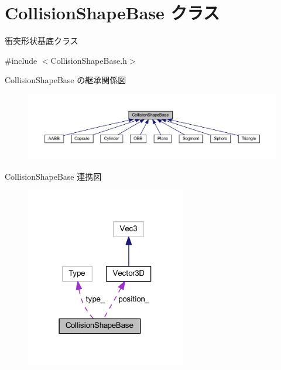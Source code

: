 \hypertarget{class_collision_shape_base}{}\section{Collision\+Shape\+Base クラス}
\label{class_collision_shape_base}


衝突形状基底クラス  




{\ttfamily \#include $<$Collision\+Shape\+Base.\+h$>$}



Collision\+Shape\+Base の継承関係図\nopagebreak
\begin{figure}[H]
\begin{center}
\leavevmode
\includegraphics[width=350pt]{class_collision_shape_base__inherit__graph}
\end{center}
\end{figure}


Collision\+Shape\+Base 連携図\nopagebreak
\begin{figure}[H]
\begin{center}
\leavevmode
\includegraphics[width=198pt]{class_collision_shape_base__coll__graph}
\end{center}
\end{figure}
